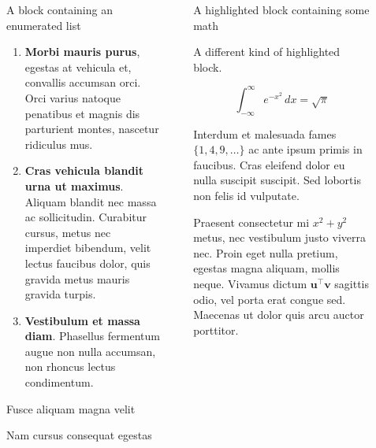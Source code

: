 \documentclass[final]{beamer}
\newlength{\sepwidth}
\newlength{\colwidth}
\newcommand{\separatorcolumn}{\begin{column}{\sepwidth}\end{column}}
\begin{document}
\begin{frame}[t]
\begin{columns}[t]
\begin{column}{\colwidth}
\end{column}

\separatorcolumn

\begin{column}{\colwidth}

  \begin{block}{A block containing an enumerated list}
   \begin{enumerate}
      \item \textbf{Morbi mauris purus}, egestas at vehicula et, convallis
        accumsan orci. Orci varius natoque penatibus et magnis dis parturient
        montes, nascetur ridiculus mus.
      \item \textbf{Cras vehicula blandit urna ut maximus}. Aliquam blandit nec
        massa ac sollicitudin. Curabitur cursus, metus nec imperdiet bibendum,
        velit lectus faucibus dolor, quis gravida metus mauris gravida turpis.
      \item \textbf{Vestibulum et massa diam}. Phasellus fermentum augue non
        nulla accumsan, non rhoncus lectus condimentum.
    \end{enumerate}

  \end{block}

  \begin{block}{Fusce aliquam magna velit}
  \end{block}

  \begin{block}{Nam cursus consequat egestas}
  \end{block}

\end{column}

\separatorcolumn

\begin{column}{\colwidth}

  \begin{exampleblock}{A highlighted block containing some math}

    A different kind of highlighted block.

    $$
    \int_{-\infty}^{\infty} e^{-x^2}\,dx = \sqrt{\pi}
    $$

    Interdum et malesuada fames $\{1, 4, 9, \ldots\}$ ac ante ipsum primis in
    faucibus. Cras eleifend dolor eu nulla suscipit suscipit. Sed lobortis non
    felis id vulputate.


    Praesent consectetur mi $x^2 + y^2$ metus, nec vestibulum justo viverra
    nec. Proin eget nulla pretium, egestas magna aliquam, mollis neque. Vivamus
    dictum $\mathbf{u}^\intercal\mathbf{v}$ sagittis odio, vel porta erat
    congue sed. Maecenas ut dolor quis arcu auctor porttitor.


\end{exampleblock}
\end{column}
\end{columns}
\end{frame}
\end{document}
